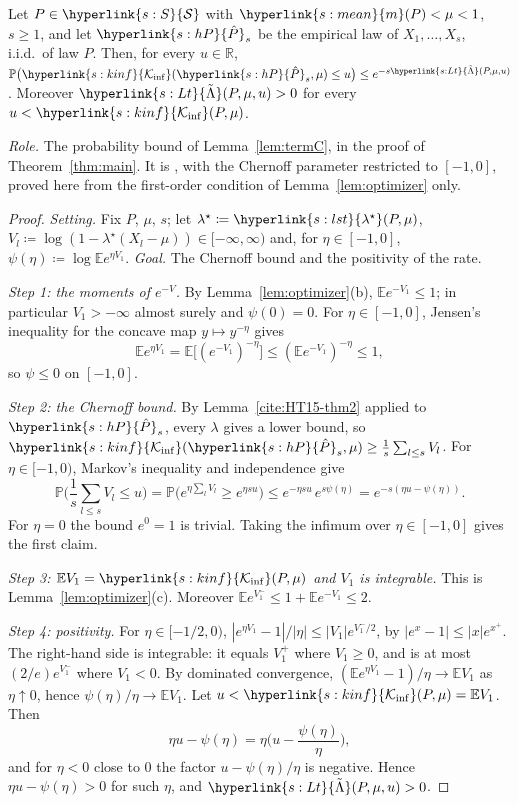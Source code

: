 \documentclass[11pt]{article}
\newcommand{\E}{\mathbb{E}}
\newcommand{\Prob}{\mathbb{P}}
\newcommand{\R}{\mathbb{R}}
\newcommand{\sy}[2]{{\hyperlink{#1}{#2}}}
\newcommand{\Sm}{\sy{s:S}{\mathcal{S}}}
\newcommand{\mean}{\sy{s:mean}{m}}
\newcommand{\Kinf}{\sy{s:kinf}{\mathcal{K}_{\inf}}}
\newcommand{\hP}{\sy{s:hP}{\hat{P}}}
\newcommand{\lst}{\sy{s:lst}{\lambda^{\star}}}
\newcommand{\Lt}{\sy{s:Lt}{\tilde{\Lambda}}}
\begin{document}
\begin{lemma}\label{lem:subopt}
Let $P\in\Sm$ with $\mean(P)<\mu<1$, $s\ge1$, and let $\hP_s$ be the empirical law of $X_1,\dots,X_s$,
i.i.d.\ of law $P$. Then, for every $u\in\R$,
$\Prob\big(\Kinf(\hP_s,\mu)\le u\big)\le e^{-s\Lt(P,\mu,u)}$. Moreover $\Lt(P,\mu,u)>0$ for every
$u<\Kinf(P,\mu)$.
\end{lemma}

\emph{Role.} The probability bound of Lemma~\ref{lem:termC}, in the proof of Theorem~\ref{thm:main}. It is
\citet[Proposition~10]{HT15}, with the Chernoff parameter restricted to $[-1,0]$, proved here from
the first-order condition of Lemma~\ref{lem:optimizer} only.

\begin{proof}
\emph{Setting.} Fix $P$, $\mu$, $s$; let $\lambda^\star\coloneqq\lst(P,\mu)$,
$V_l\coloneqq\log(1-\lambda^\star(X_l-\mu))\in[-\infty,\infty)$ and, for $\eta\in[-1,0]$,
$\psi(\eta)\coloneqq\log\E e^{\eta V_1}$. \emph{Goal.} The Chernoff bound and the positivity of the
rate.

\emph{Step 1: the moments of $e^{-V}$.} By Lemma~\ref{lem:optimizer}(b), $\E e^{-V_1}\le1$; in
particular $V_1>-\infty$ almost surely and $\psi(0)=0$. For $\eta\in[-1,0]$, Jensen's inequality for
the concave map $y\mapsto y^{-\eta}$ gives
\[
  \E e^{\eta V_1}=\E\big[(e^{-V_1})^{-\eta}\big]\le(\E e^{-V_1})^{-\eta}\le1,
\]
so $\psi\le0$ on $[-1,0]$.

\emph{Step 2: the Chernoff bound.} By Lemma~\ref{cite:HT15-thm2} applied to $\hP_s$, every $\lambda$
gives a lower bound, so $\Kinf(\hP_s,\mu)\ge\frac1s\sum_{l\le s}V_l$. For $\eta\in[-1,0)$, Markov's
inequality and independence give
\[
  \Prob\Big(\frac1s\sum_{l\le s}V_l\le u\Big)=\Prob\Big(e^{\eta\sum_lV_l}\ge e^{\eta su}\Big)\le e^{-\eta su}\,
  e^{s\psi(\eta)}=e^{-s(\eta u-\psi(\eta))}.
\]
For $\eta=0$ the bound $e^{0}=1$ is trivial. Taking the infimum over $\eta\in[-1,0]$ gives the
first claim.

\emph{Step 3: $\E V_1=\Kinf(P,\mu)$ and $V_1$ is integrable.} This is Lemma~\ref{lem:optimizer}(c).
Moreover $\E e^{V_1^-}\le1+\E e^{-V_1}\le2$.

\emph{Step 4: positivity.} For $\eta\in[-1/2,0)$, $|e^{\eta V_1}-1|/|\eta|\le|V_1|e^{V_1^-/2}$, by
$|e^x-1|\le|x|e^{x^+}$. The right-hand side is integrable: it equals $V_1^+$ where $V_1\ge0$, and is at
most $(2/e)e^{V_1^-}$ where $V_1<0$. By dominated convergence,
$(\E e^{\eta V_1}-1)/\eta\to\E V_1$ as $\eta\uparrow0$, hence $\psi(\eta)/\eta\to\E V_1$. Let
$u<\Kinf(P,\mu)=\E V_1$. Then
\[
  \eta u-\psi(\eta)=\eta\Big(u-\frac{\psi(\eta)}{\eta}\Big),
\]
and for $\eta<0$ close to $0$ the factor $u-\psi(\eta)/\eta$ is negative. Hence $\eta u-\psi(\eta)>0$
for such $\eta$, and $\Lt(P,\mu,u)>0$.
\end{proof}
\end{document}
